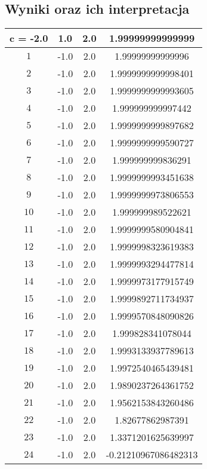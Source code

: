 \documentclass{article}
\begin{document}
\subsection{Wyniki oraz ich interpretacja}
\begin{table}[H]
\centering
\begin{tabular}{|c|c|c|c|}
\hline
c = -2.0 & 1.0 & 2.0 & 1.99999999999999 \\ \hline
\( 1 \) & -1.0 & 2.0 & 1.99999999999996  \\ \hline
\( 2 \) & -1.0 & 2.0 & 1.9999999999998401  \\ \hline
\( 3 \) & -1.0 & 2.0 & 1.9999999999993605  \\ \hline
\( 4 \) & -1.0 & 2.0 & 1.999999999997442  \\ \hline
\( 5 \) & -1.0 & 2.0 & 1.9999999999897682  \\ \hline
\( 6 \) & -1.0 & 2.0 & 1.9999999999590727  \\ \hline
\( 7 \) & -1.0 & 2.0 & 1.999999999836291  \\ \hline
\( 8 \) & -1.0 & 2.0 & 1.9999999993451638  \\ \hline
\( 9 \) & -1.0 & 2.0 & 1.9999999973806553  \\ \hline
\( 10 \) & -1.0 & 2.0 & 1.999999989522621  \\ \hline
\( 11 \) & -1.0 & 2.0 & 1.9999999580904841  \\ \hline
\( 12 \) & -1.0 & 2.0 & 1.9999998323619383  \\ \hline
\( 13 \) & -1.0 & 2.0 & 1.9999993294477814  \\ \hline
\( 14 \) & -1.0 & 2.0 & 1.9999973177915749  \\ \hline
\( 15 \) & -1.0 & 2.0 & 1.9999892711734937  \\ \hline
\( 16 \) & -1.0 & 2.0 & 1.9999570848090826  \\ \hline
\( 17 \) & -1.0 & 2.0 & 1.999828341078044 \\ \hline
\( 18 \) & -1.0 & 2.0 & 1.9993133937789613 \\ \hline
\( 19 \) & -1.0 & 2.0 & 1.9972540465439481  \\ \hline
\( 20 \) & -1.0 & 2.0 & 1.9890237264361752  \\ \hline
\( 21 \) & -1.0 & 2.0 & 1.9562153843260486  \\ \hline
\( 22 \) & -1.0 & 2.0 & 1.82677862987391  \\ \hline
\( 23 \) & -1.0 & 2.0 & 1.3371201625639997  \\ \hline
\( 24 \) & -1.0 & 2.0 & -0.21210967086482313  \\ \hline

\end{tabular}
\end{table}
\end{document}
